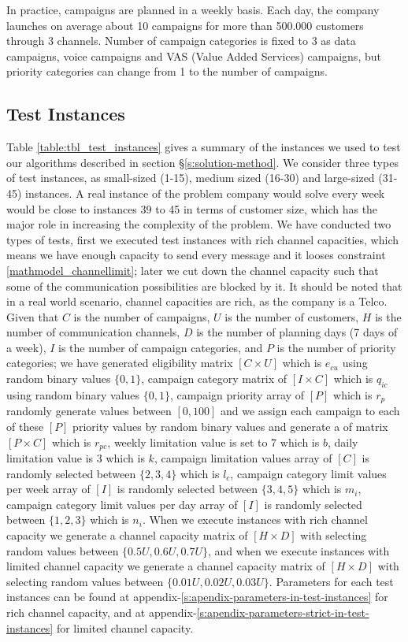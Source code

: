 \documentclass[11pt]{article}
\begin{document}
In practice, campaigns are planned in a weekly basis. Each day, the company launches on average about 10 campaigns for more than 500.000 customers through 3 channels. Number of campaign categories is fixed to 3 as data campaigns, voice campaigns and VAS (Value Added Services) campaigns, but priority categories can change from 1 to the number of campaigns.

\subsection{Test Instances} \label{test_cases}
Table \ref{table:tbl_test_instances} gives a summary of the instances we used to test our algorithms described in section \S \ref{s:solution-method}. We consider three types of test instances, as small-sized (1-15), medium sized (16-30) and large-sized (31-45) instances. A real instance of the problem company would solve every week would be close to instances 39 to 45 in terms of customer size, which has the major role in increasing the complexity of the problem. We have conducted two types of tests, first we executed test instances with rich channel capacities, which means we have enough capacity to send every message and it looses constraint \eqref{mathmodel_channellimit}; later we cut down the channel capacity such that some of the communication possibilities are blocked by it. It should be noted that in a real world scenario, channel capacities are rich, as the company is a Telco. Given that ${C}$ is the number of campaigns, ${U}$ is the number of customers, ${H}$ is the number of communication channels, ${D}$ is the number of planning days (7 days of a week), ${I}$ is the number of campaign categories, and  ${P}$ is the number of priority categories; we have generated eligibility matrix $[C \times U]$ which is $e_{cu}$ using random binary values $\{0,1\}$, campaign category matrix of $[I \times C ]$ which is $q_{ic}$ using random binary values $\{0,1\}$, campaign priority array of $[P]$ which is $r_{p}$ randomly generate values between $[0,100]$ and we assign each campaign to each of these $[P]$ priority values by random binary values and generate a of matrix $[P \times C]$ which is $r_{pc}$, weekly limitation value is set to 7 which is $b$, daily limitation value is 3 which is $k$, campaign limitation values array of $[C]$ is randomly selected between $\{2,3,4\}$ which is $l_c$, campaign category limit values per week array of $[I]$ is randomly selected between $\{3,4,5\}$ which is $m_i$, campaign category limit values per day array of $[I]$ is randomly selected between $\{1,2,3\}$ which is $n_i$. When we execute instances with rich channel capacity we generate a channel capacity matrix of $[H \times D]$ with selecting random values between $\{0.5U, 0.6U, 0.7U\}$, and when we execute instances with limited channel capacity we generate a channel capacity matrix of $[H \times D]$ with selecting random values between $\{0.01U, 0.02U, 0.03U\}.$ Parameters for each test instances can be found at appendix-\ref{s:apendix-parameters-in-test-instances} for rich channel capacity, and at appendix-\ref{s:apendix-parameters-strict-in-test-instances} for limited channel capacity.\\
\end{document}
